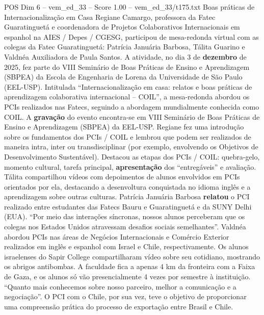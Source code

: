 \begin{textsample}{POS Dim 6 – vem\_ed\_33 – Score 1.00 – vem\_ed\_33/t175.txt}  \label{ex:f6_pos_070}
Boas práticas de Internacionalização em Casa Regiane Camargo, professora da Fatec Guaratinguetá e coordenadora de Projetos Colaborativos Internacionais em espanhol na AIES / Depes / CGESG, participou de mesa-redonda virtual com as colegas da Fatec Guaratinguetá: Patrícia Januária Barbosa, Tálita Guarino e Valdnéa Auxiliadora de Paula Santos.
A atividade, no dia 3 de \textbf{dezembro} de 2025, fez parte do VIII Seminário de Boas Práticas de Ensino e Aprendizagem (SBPEA) da Escola de Engenharia de Lorena da Universidade de São Paulo (EEL-USP).
Intitulada “Internacionalização em casa: relatos e boas práticas de aprendizagem colaborativa internacional – COIL”, a mesa-redonda abordou os PCIs realizados nas Fatecs, seguindo a abordagem mundialmente conhecida como COIL.
A \textbf{gravação} do evento encontra-se em VIII Seminário de Boas Práticas de Ensino e Aprendizagem (SBPEA) da EEL-USP.
Regiane fez uma introdução sobre os fundamentos dos PCIs / COIL e lembrou que podem ser realizados de maneira intra, inter ou transdisciplinar (por exemplo, envolvendo os Objetivos de Desenvolvimento Sustentável).
Destacou as etapas dos PCIs / COIL: quebra-gelo, momento cultural, tarefa principal, \textbf{apresentação} dos “entregáveis” e avaliação.
Tálita compartilhou vídeos com depoimentos de alunos envolvidos em PCIs orientados por ela, destacando a desenvoltura conquistada no idioma inglês e a aprendizagem sobre outras culturas.
Patrícia Januária Barbosa \textbf{relatou} o PCI realizado entre estudantes das Fatecs Bauru e Guaratinguetá e da SUNY Delhi (EUA). “Por meio das interações síncronas, nossos alunos perceberam que os colegas nos Estados Unidos atravessam desafios sociais semelhantes”.
Valdnéa abordou PCIs nas áreas de Negócios Internacionais e Comércio Exterior realizados em inglês e espanhol com Israel e Chile, respectivamente.
Os alunos israelenses do Sapir College compartilharam vídeo sobre seu cotidiano, mostrando os abrigos antibombas.
A faculdade fica a apenas 4 km da fronteira com a Faixa de Gaza, e os alunos só vão presencialmente 4 vezes por semestre à instituição. “Quanto mais conhecemos sobre nosso parceiro, melhor a comunicação e a negociação”.
O PCI com o Chile, por sua vez, teve o objetivo de proporcionar uma compreensão prática do processo de exportação entre Brasil e Chile.

\end{textsample}

